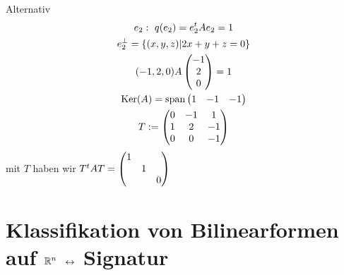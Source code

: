 \begin{Bsp}{Alternativ}
  \begin{gather*}
    e_2:\ q(e_2)=e^t_2Ae_2=1\\
    e_2^\perp = \left\{ (x,y,z)|2x+y+z=0 \right\}\\
    (-1,2,0)A\begin{pmatrix}-1\\2\\0\end{pmatrix}=1\\
    \operatorname{Ker}(A)=\operatorname{span}\begin{pmatrix}1&-1&-1\end{pmatrix}\\
    T:=\begin{pmatrix}0&-1&1\\1&2&-1\\0&0&-1\end{pmatrix}
  \end{gather*}
  mit $T$ haben wir $T^tAT=\begin{pmatrix}1&&\\&1&\\&&0\end{pmatrix}$
\end{Bsp}
\section{Klassifikation von Bilinearformen auf $\mathbb{R}^n$ $\leftrightarrow$ Signatur}
